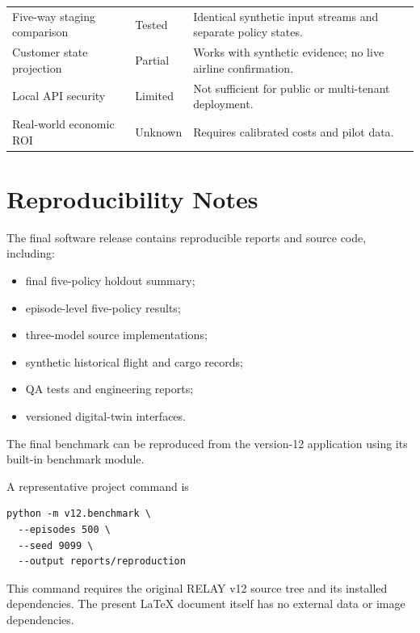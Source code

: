 \documentclass[10pt,a4paper]{article}
\theoremstyle{plain}
\theoremstyle{definition}
\theoremstyle{remark}
\begin{document}
\begin{longtable}{@{}p{48mm}p{22mm}p{84mm}@{}}
Five-way staging comparison &
Tested &
Identical synthetic input streams
and separate policy states. \\

Customer state projection &
Partial &
Works with synthetic evidence;
no live airline confirmation. \\

Local API security &
Limited &
Not sufficient for public
or multi-tenant deployment. \\

Real-world economic ROI &
Unknown &
Requires calibrated costs and pilot data. \\

\bottomrule

\end{longtable}

\section{Reproducibility Notes}

The final software release contains
reproducible reports and source code,
including:

\begin{itemize}[leftmargin=18pt,itemsep=2pt]
\item
final five-policy holdout summary;
\item
episode-level five-policy results;
\item
three-model source implementations;
\item
synthetic historical flight and cargo records;
\item
QA tests and engineering reports;
\item
versioned digital-twin interfaces.
\end{itemize}

The final benchmark can be reproduced
from the version-12 application
using its built-in benchmark module.

A representative project command is

\begin{verbatim}
python -m v12.benchmark \
  --episodes 500 \
  --seed 9099 \
  --output reports/reproduction
\end{verbatim}

This command requires the original
RELAY v12 source tree and its
installed dependencies.
The present LaTeX document itself
has no external data or image dependencies.
\end{document}

